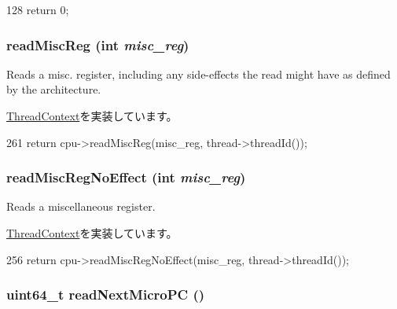 \begin{DoxyCode}
128     { return 0; }
\end{DoxyCode}
\hypertarget{classInOrderThreadContext_a5a8c6c487e8da143d26188258b04f1cc}{
\subsubsection[{readMiscReg}]{ readMiscReg (int {\em misc\_\-reg})}}
\label{classInOrderThreadContext_a5a8c6c487e8da143d26188258b04f1cc}
Reads a misc. register, including any side-\/effects the read might have as defined by the architecture. 

\hyperlink{classThreadContext_a6888f4bff21e34892e59654ea80073b2}{ThreadContext}を実装しています。


\begin{DoxyCode}
261     { return cpu->readMiscReg(misc_reg, thread->threadId()); }
\end{DoxyCode}
\hypertarget{classInOrderThreadContext_a7b5ac6af9c2c19d7c1b442b8a3aebbc6}{
\subsubsection[{readMiscRegNoEffect}]{ readMiscRegNoEffect (int {\em misc\_\-reg})}}
\label{classInOrderThreadContext_a7b5ac6af9c2c19d7c1b442b8a3aebbc6}
Reads a miscellaneous register. 

\hyperlink{classThreadContext_a93c9c97261cb7289d5976b8222f70c4c}{ThreadContext}を実装しています。


\begin{DoxyCode}
256     { return cpu->readMiscRegNoEffect(misc_reg, thread->threadId()); }
\end{DoxyCode}
\hypertarget{classInOrderThreadContext_aa2e28fd8a172666817bb94bf10fb2802}{
\subsubsection[{readNextMicroPC}]{\setlength{\rightskip}{0pt plus 5cm}uint64\_\-t readNextMicroPC ()}}
\label{classInOrderThreadContext_aa2e28fd8a172666817bb94bf10fb2802}



